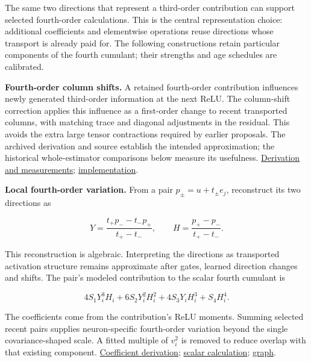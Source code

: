\documentclass[11pt,letterpaper]{article}
\begin{document}
The same two directions that represent a third-order contribution can support selected fourth-order calculations. This is the central representation choice: additional coefficients and elementwise operations reuse directions whose transport is already paid for. The following constructions retain particular components of the fourth cumulant; their strengths and age schedules are calibrated.

\textbf{Fourth-order column shifts.} A retained fourth-order contribution influences newly generated third-order information at the next ReLU. The column-shift correction applies this influence as a first-order change to recent transported columns, with matching trace and diagonal adjustments in the residual. This avoids the extra large tensor contractions required by earlier proposals. The archived derivation and source establish the intended approximation; the historical whole-estimator comparisons below measure its usefulness. \href{https://github.com/mattliston/arc-whitebox-estimation-challenge/blob/main/experiments/fourth-order-terms/young-column-fourth-cumulant-shifts-reduce-held-out-error/}{Derivation and measurements}; \href{https://github.com/mattliston/arc-whitebox-estimation-challenge/blob/main/submissions/337641/estimator.py\#L10771}{implementation}.

\textbf{Local fourth-order variation.} From a pair \(p_\pm=u+t_\pm e_j\), reconstruct its two directions as

\begin{equation}
Y=\frac{t_+p_--t_-p_+}{t_+-t_-},\qquad
H=\frac{p_+-p_-}{t_+-t_-}.
\end{equation}

This reconstruction is algebraic. Interpreting the directions as transported activation structure remains approximate after gates, learned direction changes and shifts. The pair's modeled contribution to the scalar fourth cumulant is

\begin{equation}
4S_1Y_i^3H_i+6S_2Y_i^2H_i^2+4S_3Y_iH_i^3+S_4H_i^4.
\end{equation}

The coefficients come from the contribution's ReLU moments. Summing selected recent pairs supplies neuron-specific fourth-order variation beyond the single covariance-shaped scale. A fitted multiple of \(v_i^2\) is removed to reduce overlap with that existing component. \href{https://github.com/mattliston/arc-whitebox-estimation-challenge/blob/main/experiments/fourth-order-terms/young-pair-hub-coefficients-give-non-isotropic-kurtosis-correction/K4L_SPEC.md}{Coefficient derivation}; \href{https://github.com/mattliston/arc-whitebox-estimation-challenge/blob/main/submissions/337641/estimator.py\#L10967}{scalar calculation}; \href{https://mattliston.github.io/arc-whitebox-estimation-challenge/\#node=dev-local-fourth&view=map}{graph}.
\end{document}
